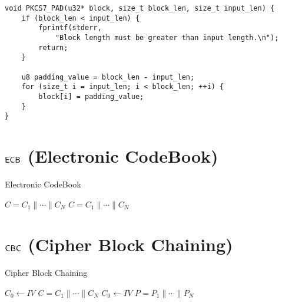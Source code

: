 \begin{lstlisting}[style=C]
void PKCS7_PAD(u32* block, size_t block_len, size_t input_len) {
	if (block_len < input_len) {
		fprintf(stderr,
			"Block length must be greater than input length.\n");
		return;
	}
	
	u8 padding_value = block_len - input_len;
	for (size_t i = input_len; i < block_len; ++i) {
		block[i] = padding_value;
	}
}
\end{lstlisting}

\newpage
\section{$\mathsf{ECB}$ (Electronic CodeBook)}
\begin{algorithm}[H]
	\caption{Electronic CodeBook}
	\begin{multicols}{2}
		\BlankLine
		\Return $C=C_1\parallel\cdots\parallel C_N$\;
		\columnbreak %
		\setcounter{AlgoLine}{0}  %
		\BlankLine
		\Return $C=C_1\parallel\cdots\parallel C_N$\;
	\end{multicols}
	\BlankLine
\end{algorithm}

\newpage
\section{$\mathsf{CBC}$ (Cipher Block Chaining)}

\begin{algorithm}[H]
	\caption{Cipher Block Chaining}
	\begin{multicols}{2}
		\BlankLine
		$C_0\gets IV$\;
		\Return $C=C_1\parallel\cdots\parallel C_N$\;
		\columnbreak %
		\setcounter{AlgoLine}{0}  %
		\BlankLine
		$C_0\gets IV$\;
		\Return $P=P_1\parallel\cdots\parallel P_N$\;
	\end{multicols}
	\BlankLine
\end{algorithm}


